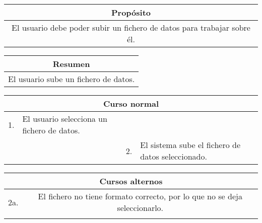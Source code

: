 \begin{table}[!h]
\begin{tabular}{|c|}
\hline
\cellcolor{cyan} \textbf{Propósito} \\
\hline
El usuario debe poder subir un fichero de datos para trabajar sobre él.  \\
\hline
\end{tabular}
\end{table}

\begin{table}[!h]
\begin{tabular}{|c|}
\hline
\cellcolor{cyan} \textbf{Resumen}  \\
\hline
El usuario sube un fichero de datos.    \\
\hline
\end{tabular}
\end{table}

\begin{table}[!h]
\begin{tabularx}{\textwidth}{|c|X|c|X|}
\hline
\multicolumn{4}{|c|}{\cellcolor{cyan} \textbf{Curso normal}} \\
\hline
      1.        &      El usuario selecciona un fichero de datos.         &              &              \\
\hline
              &               &      2.        &    El sistema sube el fichero de datos seleccionado.          \\
\hline
\end{tabularx}
\end{table}

\begin{table}[!h]
\begin{tabular}{|c|c|}
\hline
\multicolumn{2}{|c|}{\cellcolor{cyan} \textbf{Cursos alternos}} \\
\hline
      2a.        &    El fichero no tiene formato correcto, por lo que no se deja seleccionarlo.          \\
\hline
              &              \\
\hline
\end{tabular}
\end{table}

